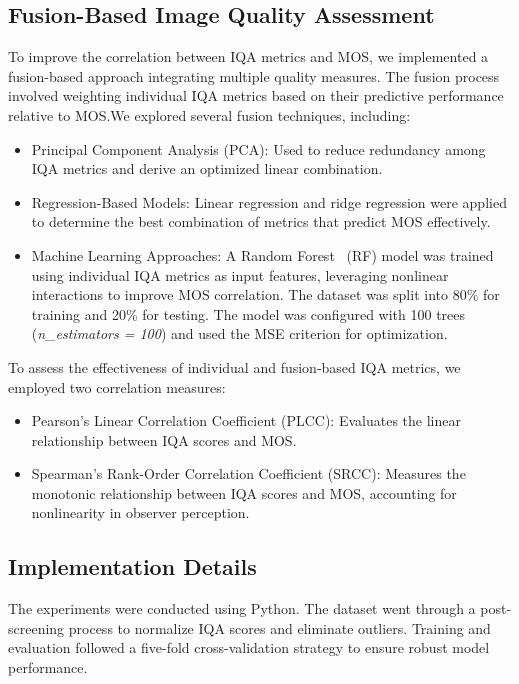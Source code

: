 \subsection{Fusion-Based Image Quality Assessment}

To improve the correlation between IQA metrics and MOS, we implemented a fusion-based approach integrating multiple quality measures. The fusion process involved weighting individual IQA metrics based on their predictive performance relative to MOS.\@ We explored several fusion techniques, including:

\begin{itemize}
    \item Principal Component Analysis (PCA): Used to reduce redundancy among IQA metrics and derive an optimized linear combination.
    \item Regression-Based Models: Linear regression and ridge regression were applied to determine the best combination of metrics that predict MOS effectively.
    \item Machine Learning Approaches: A Random Forest~\cite{breiman2001random} (RF) model was trained using individual IQA metrics as input features, leveraging nonlinear interactions to improve MOS correlation. The dataset was split into 80\% for training and 20\% for testing. The model was configured with 100 trees (\textit{n\_estimators = 100}) and used the MSE criterion for optimization.

\end{itemize}

To assess the effectiveness of individual and fusion-based IQA metrics, we employed two correlation measures:

\begin{itemize}
    \item Pearson's Linear Correlation Coefficient (PLCC): Evaluates the linear relationship between IQA scores and MOS.\@
    \item Spearman's Rank-Order Correlation Coefficient (SRCC): Measures the monotonic relationship between IQA scores and MOS, accounting for nonlinearity in observer perception.
\end{itemize}

\subsection{Implementation Details}

The experiments were conducted using Python. The dataset went through a post-screening process to normalize IQA scores and eliminate outliers. Training and evaluation followed a five-fold cross-validation strategy to ensure robust model performance.
